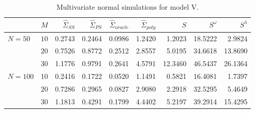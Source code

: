 \begin{table}[H]\label{simulation-1-entropy-loss-sigma-5}
\centering
\caption{Multivariate normal simulations for model V.}
\begin{tabular}{lrrrrrrrr}
 & $M$ &$\hat{\Sigma}_{SS}$& $\hat{\Sigma}_{PS}$ &$\hat{\Sigma}_{oracle}$& $\hat{\Sigma}_{poly}$ & $S$ &$S^\omega$& $S^\lambda$ \\ 
  \hline
 $N = 50$ & $10$ & 0.2743 & 0.2464 & 0.0986 & 1.2420 & 1.2023 & 18.5222 & 2.9824 \\ 
  & $20$ & 0.7526 & 0.8772 & 0.2512 & 2.8557 & 5.0195 & 34.6618 & 13.8690 \\ 
  & $30$ & 1.1776 & 0.9791 & 0.2641 & 4.5791 & 12.3460 & 46.5437 & 26.1364 \\ 
 $N = 100$ & 10 & 0.2416 & 0.1722 & 0.0520 & 1.1491 & 0.5821 & 16.4081 & 1.7397 \\ 
  & $20$ & 0.7286 & 0.2965 & 0.0827 & 2.9080 & 2.2918 & 32.5295 & 5.4649 \\ 
   & $30$ & 1.1813 & 0.4291 & 0.1799 & 4.4402 & 5.2197 & 39.2914 & 15.4295 \\ 
   \hline
\end{tabular}
\end{table}
